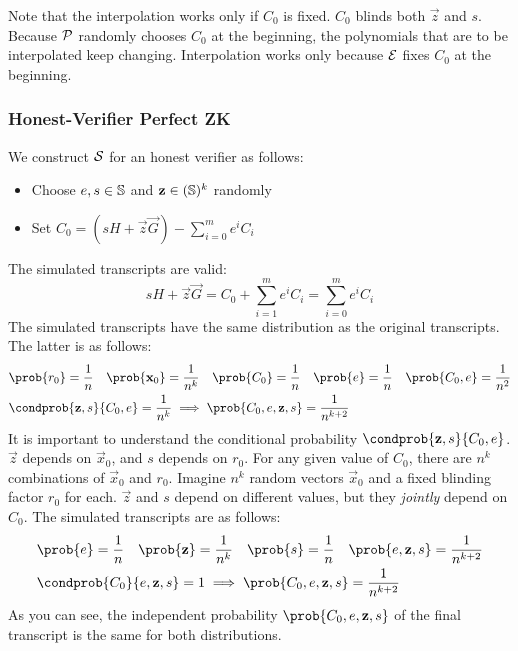 Note that the interpolation works only if $C_0$ is fixed.
$C_0$ blinds both $\vec{z}$ and $s$.
Because $\mathcal{P}$ randomly chooses $C_0$ at the beginning,
the polynomials that are to be interpolated keep changing.
Interpolation works only because $\mathcal{E}$ fixes $C_0$ at the beginning.
 
\subsubsection{Honest-Verifier Perfect ZK}

We construct $\mathcal{S}$ for an honest verifier as follows:

\begin{itemize}
    \item Choose $e, s \in \mathbb{S}$ and $\mathbf{z} \in (\mathbb{S})^k$ randomly
    \item Set $C_0 = (sH + \vec{z}\vec{G}) - \sum^m_{i = 0} e^i C_i$
\end{itemize}
%
The simulated transcripts are valid:
\[
    sH + \vec{z}\vec{G} = C_0 + \sum^m_{i = 1} e^i C_i = \sum^m_{i = 0} e^i C_i
\]
%
The simulated transcripts have the same distribution as the original transcripts.
The latter is as follows:
%
\begin{align*}
    &\prob{r_0} = \frac{1}{n} \quad \prob{\vec{x}_0} = \frac{1}{n^k} \quad \prob{C_0} = \frac{1}{n} \quad \prob{e} = \frac{1}{n} \quad \prob{C_0, e} = \frac{1}{n^2} \\
    &\condprob{\vec{z}, s}{C_0, e} = \frac{1}{n^k} \implies \prob{C_0, e, \vec{z}, s} = \frac{1}{n^{k + 2}}
\end{align*}
%
It is important to understand the conditional probability $\condprob{\vec{z}, s}{C_0, e}$.
$\vec{z}$ depends on $\vec{x}_0$, and $s$ depends on $r_0$.
For any given value of $C_0$,
there are $n^k$ combinations of $\vec{x}_0$ and $r_0$.
Imagine $n^k$ random vectors $\vec{x}_0$ and a fixed blinding factor $r_0$ for each.
$\vec{z}$ and $s$ depend on different values, but they \emph{jointly} depend on $C_0$.
%
The simulated transcripts are as follows:
%
\begin{align*}
    &\prob{e} = \frac{1}{n} \quad \prob{\vec{z}} = \frac{1}{n^k} \quad \prob{s} = \frac{1}{n} \quad \prob{e, \vec{z}, s} = \frac{1}{n^{k + 2}} \\
    &\condprob{C_0}{e, \vec{z}, s} = 1 \implies \prob{C_0, e, \vec{z}, s} = \frac{1}{n^{k + 2}}
\end{align*}
%
As you can see, the independent probability $\prob{C_0, e, \vec{z}, s}$ of the final transcript is the same for both distributions.
